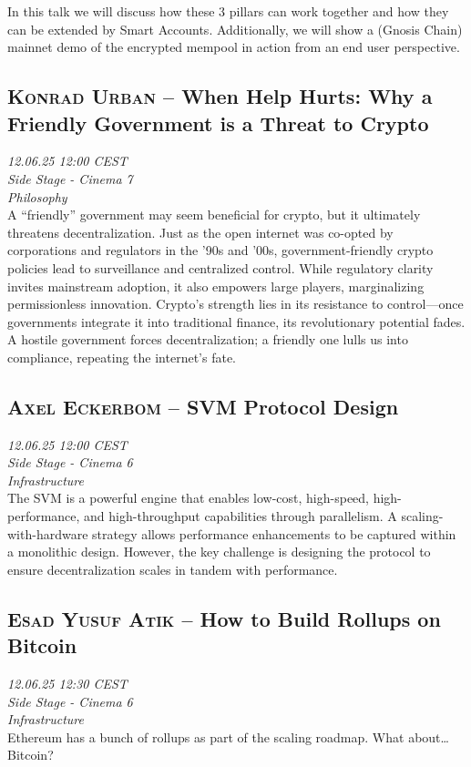 In this talk we will discuss how these 3 pillars can work together and how they can be extended by Smart Accounts. Additionally, we will show a (Gnosis Chain) mainnet demo of the encrypted mempool in action from an end user perspective.

\clearpage
\subsection {\textsc{Konrad Urban}  -- When Help Hurts: Why a Friendly Government is a Threat to Crypto} \noindent \textit {12.06.25 12:00 CEST\\ Side Stage - Cinema 7\\ Philosophy}\\[1em] A “friendly” government may seem beneficial for crypto, but it ultimately threatens decentralization. Just as the open internet was co-opted by corporations and regulators in the ’90s and ’00s, government-friendly crypto policies lead to surveillance and centralized control. While regulatory clarity invites mainstream adoption, it also empowers large players, marginalizing permissionless innovation. Crypto’s strength lies in its resistance to control—once governments integrate it into traditional finance, its revolutionary potential fades. A hostile government forces decentralization; a friendly one lulls us into compliance, repeating the internet’s fate.

\clearpage
\subsection {\textsc{Axel Eckerbom}  -- SVM Protocol Design} \noindent \textit {12.06.25 12:00 CEST\\ Side Stage - Cinema 6\\ Infrastructure}\\[1em] The SVM is a powerful engine that enables low-cost, high-speed, high-performance, and high-throughput capabilities through parallelism. A scaling-with-hardware strategy allows performance enhancements to be captured within a monolithic design. However, the key challenge is designing the protocol to ensure decentralization scales in tandem with performance.

\clearpage
\subsection {\textsc{Esad Yusuf Atik}  -- How to Build Rollups on Bitcoin} \noindent \textit {12.06.25 12:30 CEST\\ Side Stage - Cinema 6\\ Infrastructure}\\[1em] Ethereum has a bunch of rollups as part of the scaling roadmap. What about\ldots{} Bitcoin?

